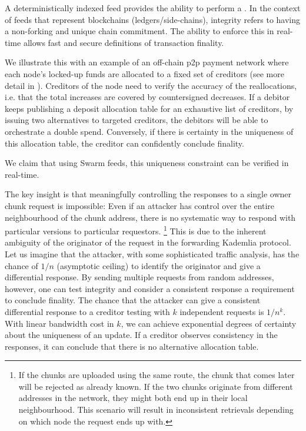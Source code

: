 A deterministically indexed feed provides the ability to perform a . In the context of feeds that represent blockchains (ledgers/side-chains), integrity refers to having a non-forking and unique chain commitment. The ability to enforce this in real-time allows fast and secure definitions of transaction finality. 

We illustrate this with an example of an off-chain p2p payment network where each node's locked-up funds are allocated to a fixed set of creditors (see more detail in \cite{ethersphere2019swap}). Creditors of the node need to verify the accuracy of the reallocations, i.e. that the total increases are covered by countersigned decreases. 
If a debitor keeps publishing a deposit allocation table for an exhaustive list of creditors, by issuing two alternatives to targeted creditors, the debitors will be able to orchestrate a double spend. Conversely, if there is certainty in the uniqueness of this allocation table, the creditor can confidently conclude finality.

We claim that using Swarm feeds, this uniqueness constraint can be verified in real-time.

The key insight is that meaningfully controlling the responses to a single owner chunk request is impossible: Even if an attacker has control over the entire neighbourhood of the chunk address, there is no systematic way to respond with particular versions to particular requestors.%
%
\footnote{If the chunks are uploaded using the same route, the chunk that comes later will be rejected as already known. If the two chunks originate from different addresses in the network, they might both end up in their local neighbourhood. This scenario will result in inconsistent retrievals depending on which node the request ends up with.}
%
This is due to the inherent ambiguity of the originator of the request in the forwarding Kademlia protocol. Let us imagine that the attacker, with some sophisticated traffic analysis, has the chance of $1/n$ (asymptotic ceiling) to identify the originator and give a differential response. By sending multiple requests from random addresses, however, one can test integrity and consider a consistent response a requirement to conclude finality. The chance that the attacker can give a consistent differential response to a creditor testing with $k$ independent requests is $1/n^k$. With linear bandwidth cost in $k$, we can achieve exponential degrees of certainty about the uniqueness of an update. If a creditor observes consistency in the responses, it can conclude that there is no alternative allocation table.


